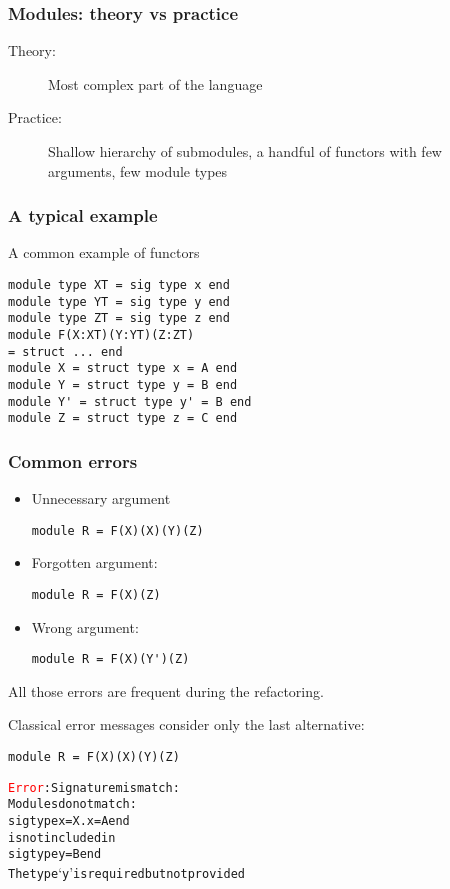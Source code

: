 \documentclass[a4paper,11pt]{beamer}
\newcommand{\error}[1]{\textcolor{red}{#1}}
\begin{document}
\begin{frame}\frametitle{Modules: theory vs practice}
\begin{description}
\item[Theory:]{Most complex part of the language}
\item[Practice:]{Shallow hierarchy of submodules, a handful of functors with few arguments, few module types}
\end{description}

\end{frame}

\begin{frame}[fragile]\frametitle{A typical example}
A common example of functors
\begin{verbatim}
module type XT = sig type x end
module type YT = sig type y end
module type ZT = sig type z end
module F(X:XT)(Y:YT)(Z:ZT)
= struct ... end
module X = struct type x = A end
module Y = struct type y = B end
module Y' = struct type y' = B end
module Z = struct type z = C end
\end{verbatim}

\end{frame}

\begin{frame}[fragile]\frametitle{Common errors}

  \begin{itemize}
    \item{Unnecessary argument
\begin{verbatim}
module R = F(X)(X)(Y)(Z)
\end{verbatim}
      }
    \item{Forgotten argument:
\begin{verbatim}
module R = F(X)(Z)
\end{verbatim}
      }
    \item{Wrong argument:
\begin{verbatim}
module R = F(X)(Y')(Z)
\end{verbatim}
      }
\end{itemize}

All those errors are frequent during the refactoring.

\end{frame}

\begin{frame}[fragile]
Classical error messages consider only the last alternative:

\begin{verbatim}
module R = F(X)(X)(Y)(Z)
\end{verbatim}

\begin{alltt}
\error{Error}: Signature mismatch:
       Modules do not match:
         sig type x = X.x = A end
       is not included in
         sig type y = B end
       The type `y' is required but not provided
 \end{alltt}
\end{frame}
\end{document}

